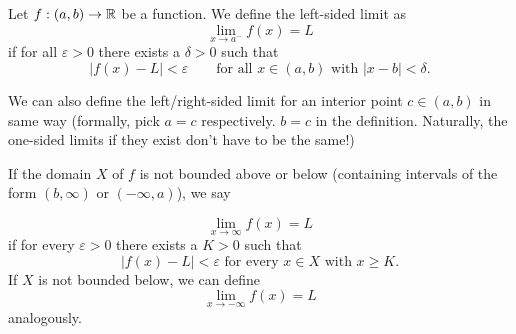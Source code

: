 \documentclass[10pt, a4paper]{article}
\begin{document}
\begin{definition}
    Let $f : (a, b) \rightarrow \mathbb{R}$ be a function.
    We define the left-sided limit as
    \[
    \lim_{x \rightarrow a ^ {-}}f(x) = L
    \]
    if for all $\varepsilon > 0$ there exists a $\delta > 0$ such that
    \[
    |f(x) - L| < \varepsilon\qquad\text{for all } x \in (a, b)\text{ with }|x - b| < \delta.
    \]
\end{definition}

We can also define the left/right-sided limit for an interior point $c \in (a, b)$ in same way
(formally,
pick $a = c$ respectively.
$b = c$ in the definition.
Naturally,
the one-sided limits if they exist don't have to be the same!)

If the domain $X$ of $f$ is not bounded above or below
(containing intervals of the form $(b, \infty)$ or $(-\infty, a)$),
we say
\begin{definition}
    \[
    \lim_{x \rightarrow \infty}f(x) = L
    \]
    if for every $\varepsilon > 0$ there exists a $K > 0$ such that
    \[
    |f(x) - L| < \varepsilon\text{ for every } x \in X\text{ with } x \geq K.
    \]
    If $X$ is not bounded below,
    we can define
    \[
    \lim_{x \rightarrow -\infty}f(x) = L
    \]
    analogously.
\end{definition}
\end{document}

